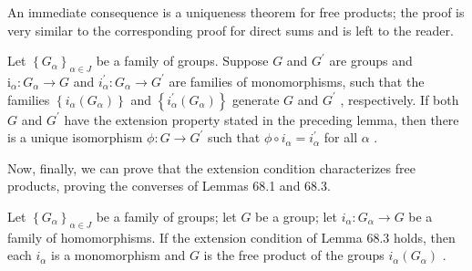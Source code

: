 An immediate consequence is a uniqueness theorem for free products; the proof is very similar to the corresponding proof for direct sums and is left to the reader.

\begin{theorem} Let \({\left\{  {G}_{\alpha }\right\}  }_{\alpha  \in  J}\) be a family of groups. Suppose \(G\) and \({G}^{\prime }\) are groups and \({\mathrm{i}}_{\alpha } : {G}_{\alpha } \rightarrow  G\) and \({i}_{\alpha }^{\prime } : {G}_{\alpha } \rightarrow  {G}^{\prime }\) are families of monomorphisms, such that the families \(\left\{  {{i}_{\alpha }\left( {G}_{\alpha }\right) }\right\}\) and \(\left\{  {{i}_{\alpha }^{\prime }\left( {G}_{\alpha }\right) }\right\}\) generate \(G\) and \({G}^{\prime }\) , respectively. If both \(G\) and \({G}^{\prime }\) have the extension property stated in the preceding lemma, then there is a unique isomorphism \(\phi  : G \rightarrow  {G}^{\prime }\) such that \(\phi  \circ  {i}_{\alpha } = {i}_{\alpha }^{\prime }\) for all \(\alpha\) .
\end{theorem}

Now, finally, we can prove that the extension condition characterizes free products, proving the converses of Lemmas 68.1 and 68.3.

\begin{lemma} Let \({\left\{  {G}_{\alpha }\right\}  }_{\alpha  \in  J}\) be a family of groups; let \(G\) be a group; let \({i}_{\alpha } : {G}_{\alpha } \rightarrow  G\) be a family of homomorphisms. If the extension condition of Lemma 68.3 holds, then each \({i}_{\alpha }\) is a monomorphism and \(G\) is the free product of the groups \({i}_{\alpha }\left( {G}_{\alpha }\right)\) .
\end{lemma}

